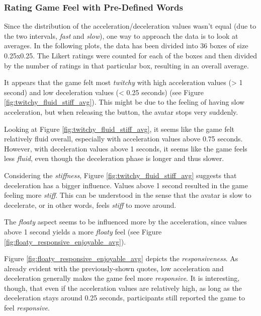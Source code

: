 
\subsubsection{Rating Game Feel with Pre-Defined Words}
Since the distribution of the acceleration/deceleration values wasn't equal (due to the two intervals, \textit{fast} and \textit{slow}), one way to approach the data is to look at averages. In the following plots, the data has been divided into 36 boxes of size 0.25x0.25. The Likert ratings were counted for each of the boxes and then divided by the number of ratings in that particular box, resulting in an overall average.

It appears that the game felt most \textit{twitchy} with high acceleration values (> 1 second) and low deceleration values (< 0.25 seconds) (see Figure \ref{fig:twitchy_fluid_stiff_avg}). This might be due to the feeling of having slow acceleration, but when releasing the button, the avatar stops very suddenly.

Looking at Figure \ref{fig:twitchy_fluid_stiff_avg}, it seems like the game felt relatively fluid overall, especially with acceleration values above 0.75 seconds. However, with deceleration values above 1 seconds, it seems like the game feels less \textit{fluid}, even though the deceleration phase is longer and thus slower.

Considering the \textit{stiffness}, Figure \ref{fig:twitchy_fluid_stiff_avg} suggests that deceleration has a bigger influence. Values above 1 second resulted in the game feeling more \textit{stiff}. This can be understood in the sense that the avatar is slow to decelerate, or in other words, feels \textit{stiff} to move around.

The \textit{floaty} aspect seems to be influenced more by the acceleration, since values above 1 second yields a more \textit{floaty} feel (see Figure \ref{fig:floaty_responsive_enjoyable_avg}).

Figure \ref{fig:floaty_responsive_enjoyable_avg} depicts the \textit{responsiveness}. As already evident with the previously-shown quotes, low acceleration and deceleration generally makes the game feel more \textit{responsive}. It is interesting, though, that even if the acceleration values are relatively high, as long as the deceleration stays around 0.25 seconds, participants still reported the game to feel \textit{responsive}.

